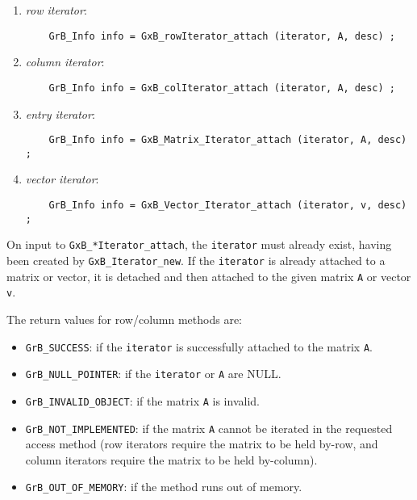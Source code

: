 \documentclass[12pt]{article}
\begin{document}
    \begin{enumerate}
    \item {\em row iterator}:
    {\footnotesize
    \begin{verbatim}
    GrB_Info info = GxB_rowIterator_attach (iterator, A, desc) ; \end{verbatim}}
    \item {\em column iterator}:
    {\footnotesize
    \begin{verbatim}
    GrB_Info info = GxB_colIterator_attach (iterator, A, desc) ; \end{verbatim}}
    \item {\em entry iterator}:
    {\footnotesize
    \begin{verbatim}
    GrB_Info info = GxB_Matrix_Iterator_attach (iterator, A, desc) ; \end{verbatim}}
    \item {\em vector iterator}:
    {\footnotesize
    \begin{verbatim}
    GrB_Info info = GxB_Vector_Iterator_attach (iterator, v, desc) ; \end{verbatim}}
    \end{enumerate}

On input to \verb'GxB_*Iterator_attach', the \verb'iterator' must already
exist, having been created by \verb'GxB_Iterator_new'.  If the \verb'iterator'
is already attached to a matrix or vector, it is detached and then attached to
the given matrix \verb'A' or vector \verb'v'.

The return values for row/column methods are:

    \begin{itemize}
    \item
    \verb'GrB_SUCCESS':         if the \verb'iterator' is successfully
        attached to the matrix \verb'A'.
    \item
    \verb'GrB_NULL_POINTER':    if the \verb'iterator' or \verb'A' are NULL.
    \item
    \verb'GrB_INVALID_OBJECT':  if the matrix \verb'A' is invalid.
    \item
    \verb'GrB_NOT_IMPLEMENTED': if the matrix \verb'A' cannot be iterated
        in the requested access method (row iterators require the matrix to
        be held by-row, and column iterators require the matrix to be held
        by-column).
    \item
    \verb'GrB_OUT_OF_MEMORY':   if the method runs out of memory.
    \end{itemize}
\end{document}
